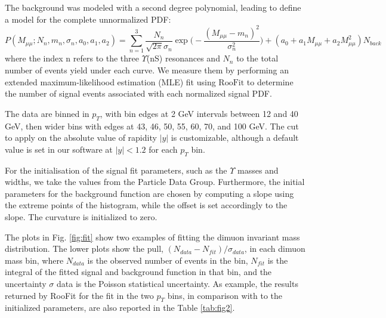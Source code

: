 \documentclass[a4paper,11pt]{article}
\begin{document}
The background was modeled with a second degree polynomial, leading to define a model for the complete unnormalized PDF:
\begin{equation}\label{model}
    P(M_{\mu\mu};N_n,m_n,\sigma_n,a_0,a_1,a_2)=
    \sum_{n=1}^3 \frac{N_n}{\sqrt{2\pi} \sigma_n} \exp\biggl(-\frac{(M_{\mu\mu}-m_n)^2}{\sigma_n^2}\biggr)+(a_0+a_1M_{\mu\mu}+a_2M_{\mu\mu}^2)N_{back}
\end{equation}
where the index n refers to the three $\Upsilon$(nS) resonances and $N_n$ to the total number of events yield under each curve. We measure them by performing an extended maximum-likelihood estimation (MLE) fit using $\text{RooFit}$ to determine the number of signal events associated with each normalized signal PDF. 

The data are binned in $p_T$, with bin edges at 2 GeV intervals between 12 and 40 GeV, then wider bins with edges at 43, 46, 50, 55, 60, 70, and 100 GeV. The cut to apply on the absolute value of rapidity $|y|$ is customizable, although a default value is set in our software at $|y|<1.2$ for each $p_T$ bin. 

For the initialisation of the signal fit parameters, such as the $\Upsilon$ masses and widths, we take the values from the Particle Data Group. Furthermore, the initial parameters for the background function are chosen by computing a slope using the extreme points of the histogram, while the offset is set accordingly to the slope. The curvature is initialized to zero.

The plots in Fig. \ref{fig:fit} show two examples of fitting the dimuon invariant mass distribution. The lower plots show the pull, $(N_{data} - N_{fit})/\sigma_{data}$, in each dimuon mass bin, where $N_{data}$ is the observed number of events in the bin, $N_{fit}$ is the integral of the fitted signal and background function in that bin, and the uncertainty $\sigma$ data is the Poisson statistical uncertainty. As example, the results returned by RooFit for the fit in the two $p_T$ bins, in comparison with to the initialized parameters, are also reported in the Table \ref{tab:fig2}. 
\end{document}

